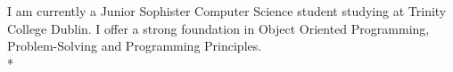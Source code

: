 \par{
I am currently a Junior Sophister Computer Science student studying at Trinity College Dublin. I offer a strong foundation in Object Oriented Programming, Problem-Solving and Programming Principles. \\*
}